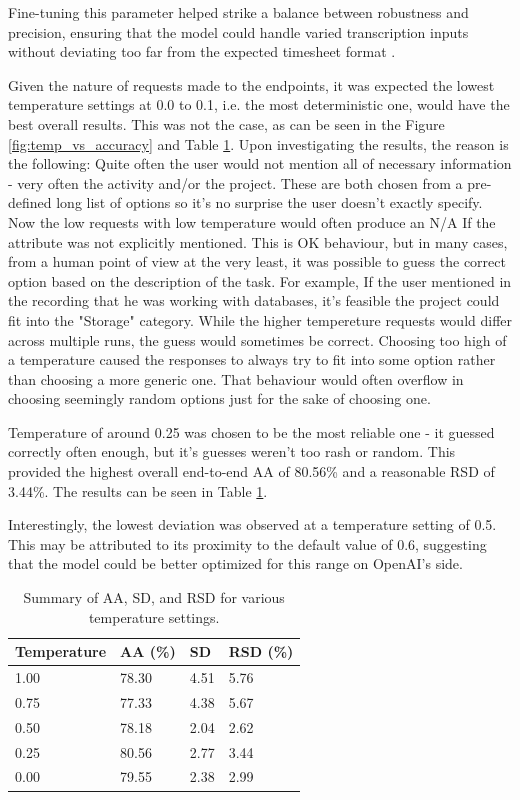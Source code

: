 \documentclass[
  digital,     %
  oneside,     %
  nosansbold,  %
  nocolorbold, %
  lof,         %
  lot,         %
]{fithesis4}
\begin{document}
Fine-tuning this parameter helped strike a balance between robustness and precision, ensuring that the model could handle varied transcription inputs without deviating too far from the expected timesheet format \cite{openaiTemp}.

Given the nature of requests made to the endpoints, it was expected the lowest temperature settings at 0.0 to 0.1, i.e. the most deterministic one, would have the best overall results. This was not the case, as can be seen in the Figure \ref{fig:temp_vs_accuracy} and Table \ref{tab:temperature_summary}. Upon investigating the results, the reason is the following: Quite often the user would not mention all of necessary information - very often the activity and/or the project. These are both chosen from a pre-defined long list of options so it's no surprise the user doesn't exactly specify. Now the low requests with low temperature would often produce an \gls{N/A} If the attribute was not explicitly mentioned. This is OK behaviour, but in many cases, from a human point of view at the very least, it was possible to guess the correct option based on the description of the task. For example, If the user mentioned in the recording that he was working with databases, it's feasible the project could fit into the "Storage" category. While the higher tempereture requests would differ across multiple runs, the guess would sometimes be correct. Choosing too high of a temperature caused the responses to always try to fit into some option rather than choosing a more generic one. That behaviour would often overflow in choosing seemingly random options just for the sake of choosing one.

Temperature of around 0.25 was chosen to be the most reliable one - it guessed correctly often enough, but it's guesses weren't too rash or random. This provided the highest overall end-to-end \gls{AA} of 80.56\% and a reasonable \gls{RSD} of 3.44\%. The results can be seen in Table \ref{tab:temperature_summary}.

Interestingly, the lowest deviation was observed at a temperature setting of 0.5. This may be attributed to its proximity to the default value of 0.6, suggesting that the model could be better optimized for this range on OpenAI's side.

\begin{table}[H]
  \centering
  \begin{tabularx}{\textwidth}{lXXX}
    \toprule
    \textbf{Temperature} & \textbf{\gls{AA} (\%)} & \textbf{\gls{SD}} & \textbf{\gls{RSD} (\%)} \\
    \midrule
    1.00  & 78.30 & 4.51 & 5.76 \\
    0.75  & 77.33 & 4.38 & 5.67 \\
    0.50  & 78.18 & 2.04 & 2.62 \\
    0.25  & 80.56 & 2.77 & 3.44 \\
    0.00  & 79.55 & 2.38 & 2.99 \\
    \bottomrule
  \end{tabularx}
  \caption{Summary of \gls{AA}, \gls{SD}, and \gls{RSD} for various temperature settings.}
  \label{tab:temperature_summary}
\end{table}
\end{document}

